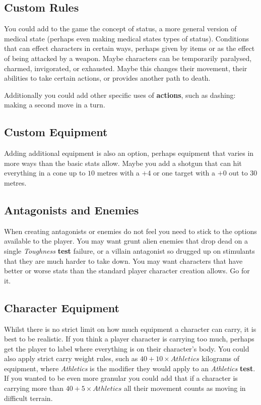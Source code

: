 \documentclass[11pt]{article}
\begin{document}
\begin{multicols}{3}
  \subsection*{Custom Rules}

  You could add to the game the concept of status, a more general version of medical state (perhaps even making medical states types of status). Conditions that can effect characters in certain ways, perhaps given by items or as the effect of being attacked by a weapon. Maybe characters can be temporarily paralysed, charmed, invigorated, or exhausted. Maybe this changes their movement, their abilities to take certain actions, or provides another path to death.

  Additionally you could add other specific uses of \textbf{actions}, such as dashing: making a second move in a turn.

  \subsection*{Custom Equipment}

  Adding additional equipment is also an option, perhaps equipment that varies in more ways than the basic stats allow. Maybe you add a shotgun that can hit everything in a cone up to $10$ metres with a $+4$ or one target with a $+0$ out to $30$ metres.

  \subsection*{Antagonists and Enemies}

  When creating antagonists or enemies do not feel you need to stick to the options available to the player. You may want grunt alien enemies that drop dead on a single \textit{Toughness} \textbf{test} failure, or a villain antagonist so drugged up on stimulants that they are much harder to take down. You may want characters that have better or worse stats than the standard player character creation allows. Go for it.

  \subsection*{Character Equipment}

  Whilst there is no strict limit on how much equipment a character can carry, it is best to be realistic. If you think a player character is carrying too much, perhaps get the player to label where everything is on their character's body. You could also apply strict carry weight rules, such as $40 + 10 \times Athletics$ kilograms of equipment, where \textit{Athletics} is the modifier they would apply to an \textit{Athletics} \textbf{test}. If you wanted to be even more granular you could add that if a character is carrying more than $40 + 5 \times Athletics$ all their movement counts as moving in difficult terrain.

\end{multicols}
\end{document}
